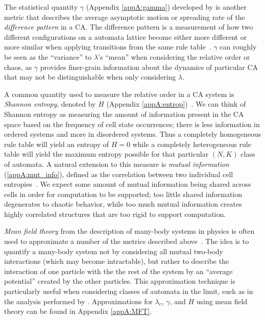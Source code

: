 \documentclass[a4paper,11pt]{report}
\begin{document}
The statistical quantity $\gamma$ (Appendix \ref{appA:gamma}) developed by \citeauthor{li90b} is another metric that describes the average asymptotic motion or spreading rate of the \textit{difference pattern} in a CA. The difference pattern is a measurement of how two different configurations on a automata lattice become either more different or more similar when applying transitions from the same rule table~\cite{li90b}. $\gamma$ can roughly be seen as the ``variance'' to $\lambda$'s ``mean'' when considering the relative order or chaos, as $\gamma$ provides finer-grain information about the dynamics of particular CA that may not be distinguishable when only considering $\lambda$.

\medskip

A common quantity used to measure the relative order in a CA system is \textit{Shannon entropy}, denoted by $H$ (Appendix \ref{appA:entrop})~\cite{la90,li90a,wo90}. We can think of Shannon entropy as measuring the amount of information present in the CA space based on the frequency of cell state occurrences; there is less information in ordered systems and more in disordered systems. Thus a completely homogeneous rule table will yield an entropy of $H = 0$ while a completely heterogeneous rule table will yield the maximum entropy possible for that particular $(N,K)$ class of automata. A natural extension to this measure is \textit{mutual information} (\ref{appA:mut_info}), defined as the correlation between two individual cell entropies~\cite{la90}. We expect some amount of mutual information being shared across cells in order for computation to be supported; too little shared information degenerates to chaotic behavior, while too much mutual information creates highly correlated structures that are too rigid to support computation.

\medskip

\textit{Mean field theory} from the description of many-body systems in physics is often used to approximate a number of the metrics described above~\cite{li90b,wo90}. The idea is to quantify a many-body system not by considering all mutual two-body interactions (which may become intractable), but rather to describe the interaction of one particle with the the rest of the system by an ``average potential'' created by the other particles. This approximation technique is particularly useful when considering classes of automata in the limit, such as in the analysis performed by \citeauthor{wo90}. Approximations for $\lambda_c$, $\gamma$, and $H$ using mean field theory can be found in Appendix \ref{appA:MFT}.
\end{document}
